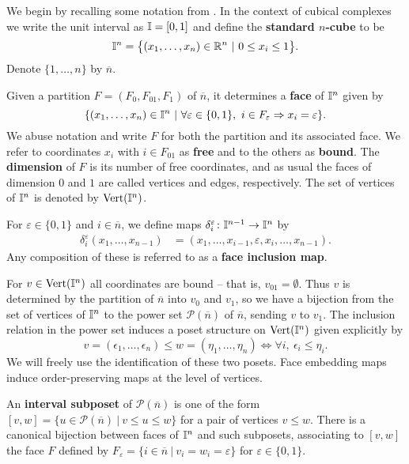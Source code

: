 We begin by recalling some notation from \cite{FMS-flows}.
In the context of cubical complexes we write the unit interval as $\mathbb{I} = [0,1]$ and define the \textbf{standard $n$-cube} to be
\begin{equation*}
	\mathbb{I}^n = \big\{ (x_1, \dots, x_n) \in \mathbb{R}^n\ |\ 0 \leq x_i \leq 1 \big\}.
\end{equation*}
Denote $\{1, \dots, n\}$ by $\overline{n}$.

Given a partition $F = (F_0, F_{01}, F_1)$ of $\overline n$, it determines a \textbf{face} of $\mathbb{I}^n$ given by
\begin{equation*}
	\{(x_1, \dots, x_n) \in \mathbb{I}^n\ |\ \forall \varepsilon \in \{0, 1\},\ i \in F_\varepsilon \Rightarrow x_i = \varepsilon\}.
\end{equation*}
We abuse notation and write $F$ for both the partition and its associated face.
We refer to coordinates $x_i$ with $i \in F_{01}$ as \textbf{free} and to the others as \textbf{bound}.
The \textbf{dimension} of $F$ is its number of free coordinates, and as usual the faces of dimension $0$ and $1$ are called vertices and edges, respectively.
The set of vertices of $\mathbb{I}^n$ is denoted by ${\rm Vert}(\mathbb{I}^n)$.

For $\varepsilon \in \{0, 1\}$ and $i \in \overline{n}$, we define maps $\delta_i^\varepsilon \colon \mathbb{I}^{n-1} \to \mathbb{I}^{n}$ by
\begin{align*}
	\delta_i^\varepsilon(x_1, \dots, x_{n-1}) & = (x_1, \dots, x_{i-1}, \varepsilon, x_i, \dots, x_{n-1}).
\end{align*}
Any composition of these is referred to as a \textbf{face inclusion map}.

For $v \in {\rm Vert}(\mathbb{I}^n)$ all coordinates are bound -- that is, $v_{01} = \emptyset$.
Thus
$v$ is determined by the partition of $\overline n$ into $v_0$ and $v_1$, so
we have a bijection from the set of vertices of $\mathbb{I}^n$ to the power set $\mathcal P(\overline n)$ of $\overline n$, sending $v$ to $v_1$.
The inclusion relation in the power set induces a poset structure on ${\rm Vert}(\mathbb{I}^n)$ given explicitly by
\begin{equation*}
	v = (\epsilon_1, \dots, \epsilon_n) \leq w = (\eta_1, \dots, \eta_n) \iff \forall i,\ \epsilon_i \leq \eta_i.
\end{equation*}
We will freely use the identification of these two posets.
Face embedding maps induce order-preserving maps at the level of vertices.

An \textbf{interval subposet} of $\mathcal P(\overline n)$ is one of the form $[v, w] = \{u \in \mathcal P(\overline n)\ |\ v \leq u \leq w\}$ for a pair of vertices $v \leq w$.
There is a canonical bijection between faces of $\mathbb{I}^n$ and such subposets, associating to $[v, w]$ the face $F$ defined by $F_\varepsilon = \{i \in \overline{n}\ |\ v_i = w_i = \varepsilon\}$ for $\varepsilon \in \{0, 1\}$.

